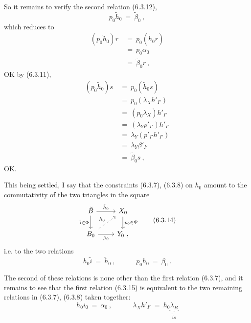 So it remains to verify the second relation (6.3.12),
\[
p_0\tilde{h}_0 \ =\ \tilde{\beta}_0\ ,
\]
which reduces to
\[
\begin{aligned}
(p_0\tilde{h}_0)r \ &=\ p_0(\tilde{h}_0r) \\
&=\ p_0\alpha_0 \\
&=\ \tilde{\beta}_0r\ ,
\end{aligned}
\]
OK by (6.3.11),
\[
\begin{aligned}
(p_0\tilde{h}_0)s \ &=\ p_0(\tilde{h}_0s) \\
&=\ p_0(\lambda_X h'_{I'}) \\
&=\ (p_0\lambda_X)h'_{I'} \\
&=\ (\lambda_Y p'_{I'})h'_{I'} \\
&=\ \lambda_Y(p'_{I'}h'_{I'}) \\
&=\ \lambda_Y\beta'_{I'} \\
&=\ \tilde{\beta}_0s\ ,
\end{aligned}
\]
OK.

This being settled, I say that the constraints (6.3.7), (6.3.8) on $h_0$ amount to the commutativity of the two triangles in the square %
\[
\begin{tikzcd}
\tilde{B} \arrow[r, "\tilde{h}_0"] \arrow[d, "\tilde{i}\in\Phi"'] & X_0 \arrow[d, "p_0\in\Psi"] \\
B_0 \arrow[r, "\beta_0"'] \arrow[ur, dotted, "h_0"] & Y_0\ ,
\end{tikzcd}
\tag*{(6.3.14)}
\]
i.e. to the two relations
\[
h_0\tilde{i} \ =\ \tilde{h}_0\ , \qquad\quad p_0h_0 \ =\ \beta_0\ .
\tag*{(6.3.15)}
\]

The second of these relations is none other than the first relation (6.3.7), and it remains to see that the first relation (6.3.15) is equivalent to the two remaining relations in (6.3.7), (6.3.8) taken together:
\[
h_0i_0 \ =\ \alpha_0\ , \qquad\quad \lambda_X h'_{I'} \ =\ h_0\underbrace{\lambda_B}_{\tilde{i}s}
\tag*{(6.3.16)}
\]
